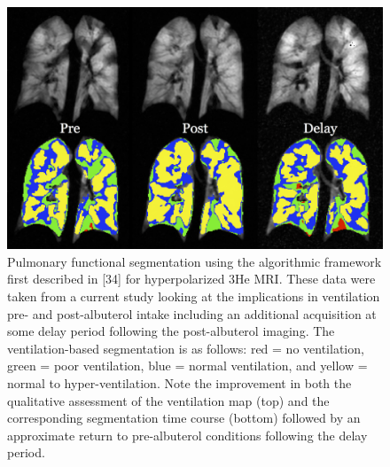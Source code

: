 \documentclass[11pt,]{article}
\begin{document}
\begin{figure}[htbp]
\centering
\includegraphics{Figs/prePostAlbuterol.png}
\caption{Pulmonary functional segmentation using the algorithmic
framework first described in {[}34{]} for hyperpolarized 3He MRI. These
data were taken from a current study looking at the implications in
ventilation pre- and post-albuterol intake including an additional
acquisition at some delay period following the post-albuterol imaging.
The ventilation-based segmentation is as follows: red = no ventilation,
green = poor ventilation, blue = normal ventilation, and yellow = normal
to hyper-ventilation. Note the improvement in both the qualitative
assessment of the ventilation map (top) and the corresponding
segmentation time course (bottom) followed by an approximate return to
pre-albuterol conditions following the delay period.}
\end{figure}
\end{document}

